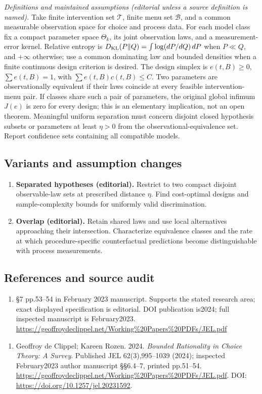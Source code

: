 \documentclass[11pt,a4paper]{article}
\begin{document}
\emph{Definitions and maintained assumptions (editorial unless a source definition is named).} Take finite intervention set \(\mathcal T\), finite menu set \(\mathcal B\), and a common measurable observation space for choice and process data. For each model class fix a compact parameter space \(\Theta_k\), its joint observation laws, and a measurement-error kernel. Relative entropy is \(D_{\rm KL}(P\Vert Q)=\int\log(dP/dQ)\,dP\) when \(P\ll Q\), and \(+\infty\) otherwise; use a common dominating law and bounded densities when a finite continuous design criterion is desired. The design simplex is \(e(t,B)\ge0\), \(\sum e(t,B)=1\), with \(\sum e(t,B)c(t,B)\le C\). Two parameters are observationally equivalent if their laws coincide at every feasible intervention-menu pair. If classes share such a pair of parameters, the original global infimum \(J(e)\) is zero for every design; this is an elementary implication, not an open theorem. Meaningful uniform separation must concern disjoint closed hypothesis subsets or parameters at least \(\eta>0\) from the observational-equivalence set. Report confidence sets containing all compatible models.
\subsection*{Variants and assumption changes}
\begin{enumerate}
\item \textbf{Separated hypotheses (editorial).} Restrict to two compact disjoint observable-law sets at prescribed distance \(\eta\). Find cost-optimal designs and sample-complexity bounds for uniformly valid discrimination.
\item \textbf{Overlap (editorial).} Retain shared laws and use local alternatives approaching their intersection. Characterize equivalence classes and the rate at which procedure-specific counterfactual predictions become distinguishable with process measurements.
\end{enumerate}
\subsection*{References and source audit}
\begin{enumerate}
\item §7 pp.53–54 in February 2023 manuscript. Supports the stated research area; exact displayed specification is editorial. DOI publication is2024; full inspected manuscript is February2023. \url{https://geoffroydeclippel.net/Working%20Papers%20PDFs/JEL.pdf}
\end{enumerate}
\begin{enumerate}\raggedright
\item\hypertarget{definitions:source:30007555:1}{} Geoffroy de Clippel; Kareen Rozen. 2024. \emph{Bounded Rationality in Choice Theory: A Survey}. Published JEL 62(3),995–1039 (2024); inspected February2023 author manuscript §§6.4–7, printed pp.51–54.
\url{https://geoffroydeclippel.net/Working%20Papers%20PDFs/JEL.pdf}.
DOI: \url{https://doi.org/10.1257/jel.20231592}.
\end{enumerate}
\end{document}
